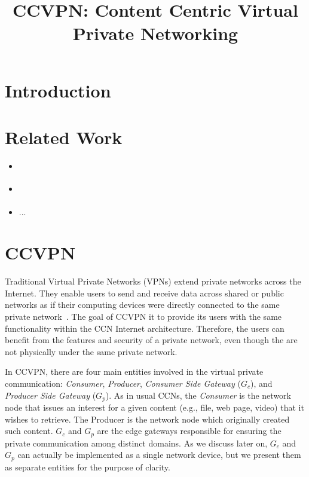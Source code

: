 \documentclass[conference,letterpaper,10pt]{IEEEtran}
\begin{document}
\title{CCVPN: Content Centric Virtual Private Networking}


\maketitle


\begin{abstract}


\end{abstract}

\begin{IEEEkeywords}
\end{IEEEkeywords}

\IEEEpeerreviewmaketitle

\section{Introduction}


\section{Related Work}\label{related}

\begin{itemize}
\item \cite{tsudik2016ac3n}
\item \cite{dibenedetto2011andana}
\item ...
\end{itemize}

\section{CCVPN}\label{metho}

Traditional Virtual Private Networks (VPNs) extend private networks across the Internet. They enable users to send and receive data across shared or public networks as if their computing devices were directly connected to the same private network~\cite{khanvilkar2004virtual}. The goal of CCVPN it to provide its users with the same functionality within the CCN Internet architecture. Therefore, the users can benefit from the features and security of a private network, even though the are not physically under the same private network.

In CCVPN, there are four main entities involved in the virtual private communication: \textit{Consumer}, \textit{Producer}, \textit{Consumer Side Gateway} ($G_c$), and \textit{Producer Side Gateway} ($G_p$). As in usual CCNs, the \textit{Consumer} is the network node that issues an interest for a given content (e.g., file, web page, video) that it wishes to retrieve. The Producer is the network node which originally created such content. $G_c$ and $G_p$ are the edge gateways responsible for ensuring the private communication among distinct domains. As we discuss later on, $G_c$ and $G_p$ can actually be implemented as a single network device, but we present them as separate entities for the purpose of clarity.
\end{document}
